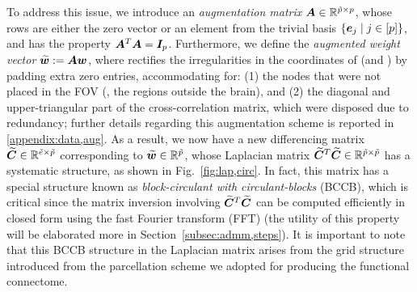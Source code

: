 To address this issue, we introduce an \emph{augmentation matrix} ${\bm{A}}\in\mathbb{R}^{{\tilde{p}}\times p}$, whose rows are either the zero vector or an element from the trivial basis $\left\{\bm{e}_j \; |\; j\in[p]\right\}$, and has the property ${\bm{A}}^T{\bm{A}}={\bm{I}}_p$.
Furthermore, we define the \emph{augmented weight vector} ${\bm{\widetilde{w}}}:={\bm{A}}{\bm{w}}$, where \A rectifies the irregularities in the coordinates of \w (and \x) by padding extra zero entries, accommodating for:
(1) the nodes that were not placed in the FOV (\ie, the regions outside the brain), and
(2) the diagonal and upper-triangular part of the cross-correlation matrix, which were disposed due to redundancy; further details regarding this augmentation scheme is reported in \ref{appendix:data,aug}.
As a result, we now have a new differencing matrix ${\bm{\widetilde{C}}}\in\mathbb{R}^{\tilde{e}\times{\ensuremath{\tilde{p}}}}$ corresponding to ${\bm{\widetilde{w}}}\in\mathbb{R}^{\tilde{p}}$, whose Laplacian matrix ${\bm{\widetilde{C}}}^T{\bm{\widetilde{C}}}\in\mathbb{R}^{{\tilde{p}}\times{\ensuremath{\tilde{p}}}}$ has a systematic structure, as shown in Fig.~\ref{fig:lap,circ}.
In fact, this matrix has a special structure known as \emph{block-circulant with circulant-blocks} (BCCB), which is critical since the matrix inversion involving ${\bm{\widetilde{C}}}^T{\bm{\widetilde{C}}}$ can be computed efficiently in closed form using the fast Fourier transform (FFT) (the utility of this property will be elaborated more in Section~\ref{subsec:admm,steps}).  
It is important to note that this BCCB structure in the Laplacian matrix arises from the grid structure introduced from the parcellation scheme we adopted for producing the functional connectome.

